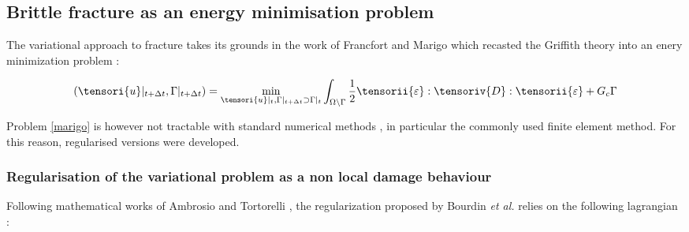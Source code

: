 \subsection{Brittle fracture as an energy minimisation problem}

The variational approach to fracture takes its grounds in the work of
Francfort and Marigo which recasted the Griffith theory into an enery
minimization problem \cite{francfort_revisiting_1998, francfort_vers_2002}:

\begin{equation}
    \label{marigo}
    (\tensori{u} \vert_{t + \Delta t}, \Gamma \vert_{t + \Delta t}) =
    \min_{\tensori{u} \vert_{t}, \Gamma \vert_{t + \Delta t} \supset \Gamma \vert_{t}}
    \int_{\Omega \backslash \Gamma} \frac{1}{2} \tensorii{\varepsilon} : \tensoriv{D} : \tensorii{\varepsilon}
    +
    G_c \Gamma
\end{equation}


Problem \eqref{marigo} is however not tractable with standard
numerical methods \cite{2000_BOURDIN_FRACNFORT_MARIGO_NumericalExperimentsInRevisitedBrittleFracture, chambolle_approximation_2018}, in particular
the commonly used finite element method. For this reason, regularised versions were developed.

\subsubsection{Regularisation of the variational problem as a non local damage behaviour}

Following mathematical works of Ambrosio and Tortorelli
\cite{ambrosio1990approximation}, the regularization proposed by Bourdin \textit{et
al.} relies on the following lagrangian \cite{2000_BOURDIN_FRACNFORT_MARIGO_NumericalExperimentsInRevisitedBrittleFracture}:

